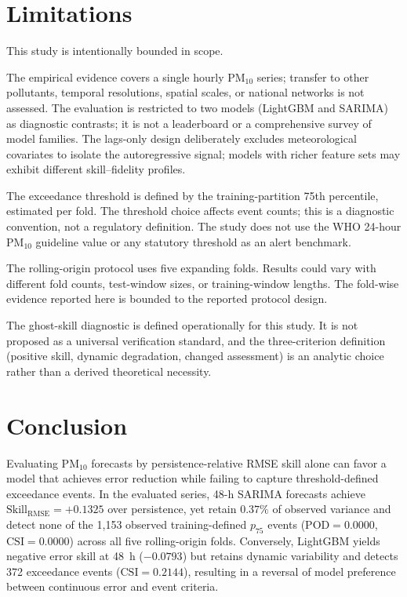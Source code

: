 \documentclass[12pt]{article}
\begin{document}
\section{Limitations}
\label{sec:limitations}

This study is intentionally bounded in scope.

The empirical evidence covers a single hourly PM$_{10}$ series; transfer
to other pollutants, temporal resolutions, spatial scales, or national
networks is not assessed. The evaluation is restricted to two models
(LightGBM and SARIMA) as diagnostic contrasts; it is not a leaderboard
or a comprehensive survey of model families. The lags-only design
deliberately excludes meteorological covariates to isolate the
autoregressive signal; models with richer feature sets may exhibit
different skill--fidelity profiles.

The exceedance threshold is defined by the training-partition 75th
percentile, estimated per fold. The threshold choice affects event
counts; this is a diagnostic convention, not a regulatory definition.
The study does not use the WHO 24-hour PM$_{10}$ guideline value or
any statutory threshold as an alert benchmark.

The rolling-origin protocol uses five expanding folds. Results could
vary with different fold counts, test-window sizes, or training-window
lengths. The fold-wise evidence reported here is bounded to the
reported protocol design.

The ghost-skill diagnostic is defined operationally for this study.
It is not proposed as a universal verification standard, and the
three-criterion definition (positive skill, dynamic degradation,
changed assessment) is an analytic choice rather than a derived
theoretical necessity.

\section{Conclusion}
\label{sec:conclusion}

Evaluating PM$_{10}$ forecasts by persistence-relative RMSE skill alone
can favor a model that achieves error reduction while failing to capture
threshold-defined exceedance events. In the evaluated series, 48-h SARIMA
forecasts achieve $\mathrm{Skill}_\mathrm{RMSE} = +0.1325$ over persistence,
yet retain $0.37\%$ of observed variance and detect none of the 1,153
observed training-defined $p_{75}$ events ($\mathrm{POD} = 0.0000$,
$\mathrm{CSI} = 0.0000$) across all five rolling-origin folds. Conversely,
LightGBM yields negative error skill at 48~h ($-0.0793$) but retains
dynamic variability and detects 372 exceedance events ($\mathrm{CSI} = 0.2144$),
resulting in a reversal of model preference between continuous error and
event criteria.
\end{document}
